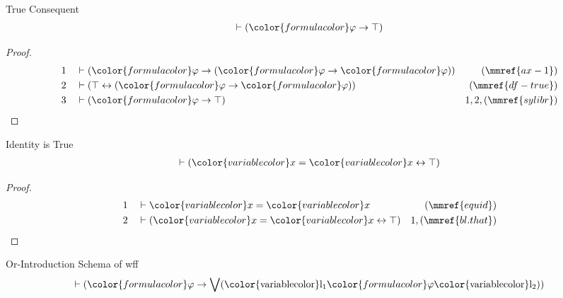 \begin{lemma} True Consequent
\begin{align}
\vdash ( {\color{formulacolor}\varphi} \rightarrow \top )\label{bl.tc}
\end{align}
\end{lemma}

\begin{proof}
\begin{align}
  1 && & \vdash ( {\color{formulacolor}\varphi} \rightarrow (
      {\color{formulacolor}\varphi} \rightarrow
      {\color{formulacolor}\varphi} )
      )&(\mmref{ax-1})\notag
  \\ 2 && & \vdash ( \top \leftrightarrow ( {\color{formulacolor}\varphi}
      \rightarrow {\color{formulacolor}\varphi} )
      )&(\mmref{df-true})\notag
  \\ 3 && & \vdash ( {\color{formulacolor}\varphi} \rightarrow \top
      )&1,2,(\mmref{sylibr})\notag
\end{align}
\end{proof}

\begin{lemma} Identity is True
\begin{align}
\vdash ( {\color{variablecolor}x} = {\color{variablecolor}x} \leftrightarrow
    \top )\label{bl.idistr}
\end{align}
\end{lemma}

\begin{proof}
\begin{align}
  1 && & \vdash {\color{variablecolor}x} =
      {\color{variablecolor}x}&(\mmref{equid})\notag
  \\ 2 && & \vdash ( {\color{variablecolor}x} = {\color{variablecolor}x}
      \leftrightarrow \top )&1,(\mmref{bl.that})\notag
\end{align}
\end{proof}

\begin{lemma} Or-Introduction Schema of wff
\begin{align}
\vdash ( {\color{formulacolor}\varphi} \rightarrow \bigvee(
    {\rm\color{variablecolor}l_1} {\color{formulacolor}\varphi}
    {\rm\color{variablecolor}l_2} ) )\label{bl.orcwl}
\end{align}
\end{lemma}

